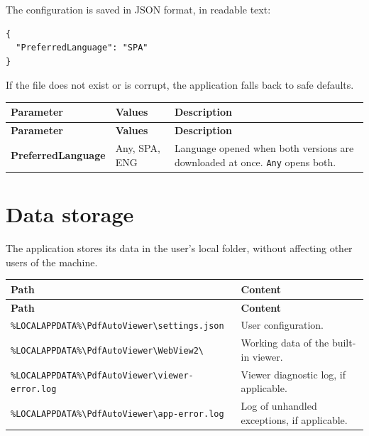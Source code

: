 \documentclass[11pt,a4paper]{article}
\newcommand{\bs}{\textbackslash\allowbreak}
\newcommand{\ruta}[1]{\texttt{\small #1}}
\begin{document}
The configuration is saved in JSON format, in readable text:

\begin{lstlisting}[caption={Example settings.json.}]
{
  "PreferredLanguage": "SPA"
}
\end{lstlisting}

If the file does not exist or is corrupt, the application falls back to safe
defaults.

\begin{xltabular}{\textwidth}{@{} >{\bfseries}p{3.4cm} p{2.2cm} L @{}}
\toprule
\normalfont\textbf{Parameter} & \textbf{Values} & \textbf{Description} \\
\midrule
\endfirsthead
\toprule
\normalfont\textbf{Parameter} & \textbf{Values} & \textbf{Description} \\
\midrule
\endhead
\bottomrule
\endfoot
PreferredLanguage & Any, SPA, ENG & Language opened when both versions are
downloaded at once. \texttt{Any} opens both. \\
\bottomrule
\end{xltabular}

\section{Data storage}
The application stores its data in the user's local folder, without affecting
other users of the machine.

\begin{xltabular}{\textwidth}{@{} L p{4.2cm} @{}}
\toprule
\textbf{Path} & \textbf{Content} \\
\midrule
\endfirsthead
\toprule
\textbf{Path} & \textbf{Content} \\
\midrule
\endhead
\bottomrule
\endfoot
\ruta{\%LOCALAPPDATA\%\bs PdfAutoViewer\bs settings.json} & User configuration. \\
\ruta{\%LOCALAPPDATA\%\bs PdfAutoViewer\bs WebView2\bs} & Working data of the built-in viewer. \\
\ruta{\%LOCALAPPDATA\%\bs PdfAutoViewer\bs viewer-error.log} & Viewer diagnostic log, if applicable. \\
\ruta{\%LOCALAPPDATA\%\bs PdfAutoViewer\bs app-error.log} & Log of unhandled exceptions, if applicable. \\
\bottomrule
\end{xltabular}
\end{document}
